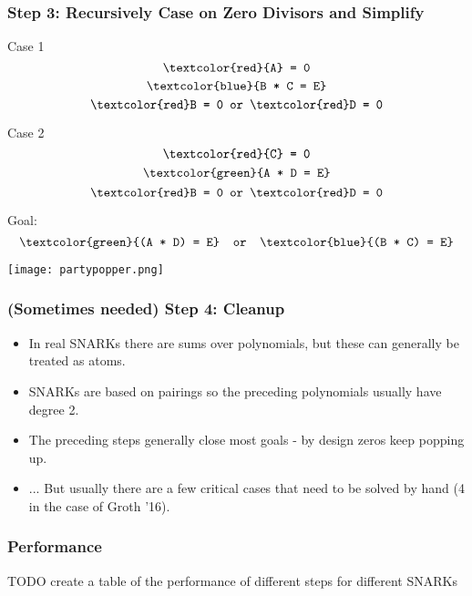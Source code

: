 \documentclass{beamer}
\begin{document}
\begin{frame}

    \frametitle{Step 3: Recursively Case on Zero Divisors and Simplify}

    \parbox[t]{5cm}{
    \centering
    Case 1
        $$ \texttt{\textcolor{red}{A} = 0}$$
        $$ \texttt{\textcolor{blue}{{B} * C = E}} $$
        $$ \texttt{\textcolor{red}B = 0 or \textcolor{red}D = 0}  $$ }%
    \hspace{1cm}%
    \parbox[t]{5cm}{
    \centering
    Case 2
        $$ \texttt{\textcolor{red}{C} = 0}$$
        $$ \texttt{\textcolor{green}{{A} * D = E}} $$
        $$ \texttt{\textcolor{red}B = 0 or \textcolor{red}D = 0}  $$ }%


    Goal:
    $$\texttt{\textcolor{green}{({A} * {D}) = {E}}  \text{ or } \textcolor{blue}{({B} * {C}) = {E}}}$$
    \begin{center}
        \texttt{[image: partypopper.png]}        
    \end{center}

\end{frame}

\begin{frame}

    \frametitle{(Sometimes needed) Step 4: Cleanup}

    \begin{itemize}
        \item In real SNARKs there are sums over polynomials, but these can generally be treated as atoms.
        \item SNARKs are based on pairings so the preceding polynomials usually have degree 2.
        \item The preceding steps generally close most goals - by design zeros keep popping up.
        \item ... But usually there are a few critical cases that need to be solved by hand (4 in the case of Groth '16).
    \end{itemize}

\end{frame}

\begin{frame}

    \frametitle{Performance}

    TODO create a table of the performance of different steps for different SNARKs 

\end{frame}
\end{document}
